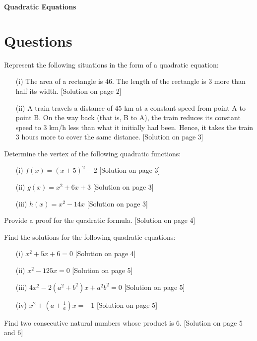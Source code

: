 \documentclass[addpoints, 12pt]{exam}
\theoremstyle{remark}
\begin{document}
\thispagestyle{empty}

\begin{center}
    {\LARGE \textbf{Quadratic Equations}}
\end{center}

\section{Questions}

\begin{questions}
\question Represent the following situations in the form of a quadratic equation:

\begin{enumerate}
    \item[(i)] The area of a rectangle is 46. The length of the rectangle is 3 more than half its width. [Solution on page 2]
    \item[(ii)] A train travels a distance of 45 km at a constant speed from point A to point B. On the way back (that is, B to A), the train reduces its constant speed to 3 km/h less than what it initially had been. Hence, it takes the train 3 hours more to cover the same distance. [Solution on page 3]
\end{enumerate}

\question Determine the vertex of the following quadratic functions:
\begin{enumerate}
    \item[(i)] $f(x) = (x + 5)^2 - 2$ [Solution on page 3]
    \item[(ii)] $g(x) = x^2 + 6x + 3$ [Solution on page 3]
    \item[(iii)] $h(x) = x^2-14x$ [Solution on page 3]
\end{enumerate}

\question Provide a proof for the quadratic formula. [Solution on page 4]

\question Find the solutions for the following quadratic equations:
\begin{enumerate}
    \item[(i)] $x^2 + 5x + 6 = 0$ [Solution on page 4]
    \item[(ii)] $x^2-125x = 0$ [Solution on page 5]
    \item[(iii)] $4x^2 -2(a^2 + b^2)x +a^2b^2 = 0$ [Solution on page 5]
    \item[(iv)] $x^2 + \left(a + \frac{1}{a}\right)x = -1$ [Solution on page 5]
\end{enumerate}

\question Find two consecutive natural numbers whose product is 6. [Solution on page 5 and 6]


\end{questions}
\end{document}
